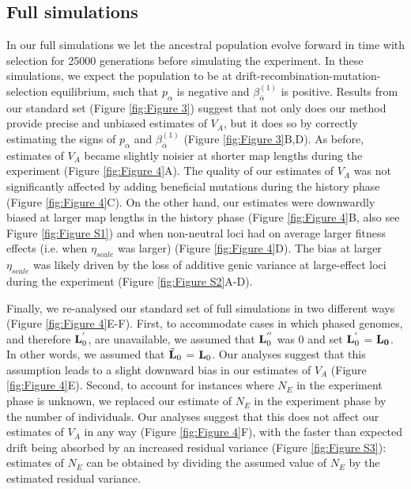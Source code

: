 \documentclass[12pt]{article}
\begin{document}
\begin{bibunit}
\subsection*{Full simulations}
In our full simulations we let the ancestral population evolve forward in time with selection for 25000 generations before simulating the experiment. In these simulations, we expect the population to be at drift-recombination-mutation-selection equilibrium, such that $p_{\alpha} $ is negative and $\beta^{(1)}_{\bar{\alpha}}$ is positive. Results from our standard set (Figure \ref{fig:Figure 3}) suggest that not only does our method provide precise and unbiased estimates of $V_A$, but it does so by correctly estimating the signs of $p_{\alpha}$ and $\beta^{(1)}_{\bar{\alpha}}$ (Figure \ref{fig:Figure 3}B,D). As before, estimates of $V_A$ became slightly noisier at shorter map lengths during the experiment (Figure \ref{fig:Figure 4}A). The quality of our estimates of $V_A$ was not significantly affected by adding beneficial mutations during the history phase (Figure \ref{fig:Figure 4}C). On the other hand, our estimates were downwardly biased at larger map lengths in the history phase (Figure \ref{fig:Figure 4}B, also see Figure \ref{fig:Figure S1}) and when non-neutral loci had on average larger fitness effects (i.e. when $\eta_{scale}$ was larger) (Figure \ref{fig:Figure 4}D). The bias at larger $\eta_{scale}$ was likely driven by the loss of additive genic variance at large-effect loci during the experiment (Figure \ref{fig:Figure S2}A-D).  

Finally, we re-analysed our standard set of full simulations in two different ways (Figure \ref{fig:Figure 4}E-F). First, to accommodate cases in which phased genomes, and therefore ${\bf L}^{'}_{0}$, are unavailable, we assumed that ${\bf L}^{''}_{0}$ was 0 and set ${\bf L}^{'}_{0}$ = $\bf L_0$. In other words, we assumed that $\tilde{\bf L}_0$ = ${\bf L}_0$. Our analyses suggest that this assumption leads to a slight downward bias in our estimates of $V_A$ (Figure \ref{fig:Figure 4}E). Second, to account for instances where $N_E$ in the experiment phase is unknown, we replaced our estimate of $N_E$ in the experiment phase by the number of individuals. Our analyses suggest that this does not affect our estimates of $V_A$ in any way (Figure \ref{fig:Figure 4}F), with the faster than expected drift being absorbed by an increased residual variance (Figure \ref{fig:Figure S3}): estimates of $N_E$ can be obtained by dividing the assumed value of $N_E$ by the estimated residual variance. 


\end{bibunit}
\end{document}
